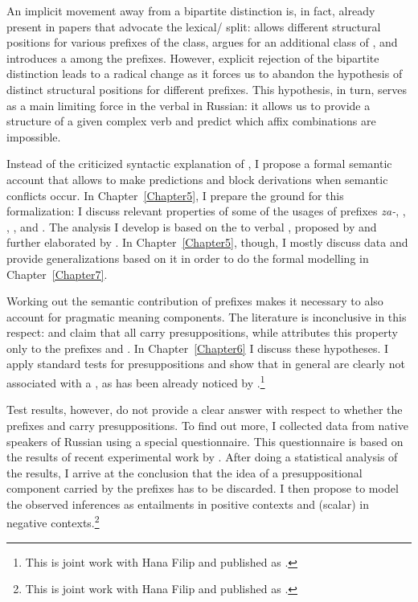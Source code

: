 An implicit movement away from a bipartite distinction is, in fact, already present in papers that advocate the lexical/ split: \citet{Svenonius:04b} allows different structural positions for various prefixes of the  class, \citet{Tatevosov:07} argues for an additional class of , and \citet{Tatevosov:09} introduces a  among the  prefixes. However, explicit rejection of the bipartite distinction leads to a radical change as it forces us to abandon the hypothesis of distinct structural positions for different prefixes. This hypothesis, in turn, serves as a main limiting force in the  verbal  in Russian: it allows us to provide a structure of a given complex verb and predict which affix combinations are impossible.

Instead of the criticized syntactic explanation of , I propose a formal semantic account that allows to make predictions and block derivations when semantic conflicts occur. In Chapter~\ref{Chapter5}, I prepare the ground for this formalization: I discuss relevant properties of some of the usages of prefixes \textit{\mbox{za-}}, , , , and . The analysis I develop is based on the  to verbal , proposed by \citet{Filip:08} and further elaborated by \citet{Kagan:12, Kagan:book}. In Chapter~\ref{Chapter5}, though, I mostly discuss data and provide generalizations based on it in order to do the formal modelling in Chapter~\ref{Chapter7}.

Working out the semantic contribution of prefixes makes it necessary to also account for pragmatic meaning components. The literature is inconclusive in this respect: \citet{Paducheva:96} and \citet{Romanova:06} claim that all  carry presuppositions, while \citet{Kagan:book} attributes this property only to the prefixes  and . In Chapter~\ref{Chapter6} I discuss these hypotheses. I apply standard tests for presuppositions and show that  in general are clearly not associated with a , as has been already noticed by \citet{Gronn:04}.\footnote{This is joint work with Hana Filip and published as \citealt{ZinovaFilip:14}.}

Test results, however, do not provide a clear answer with respect to whether the prefixes  and  carry presuppositions. To find out more, I collected data from native speakers of Russian using a special questionnaire. This questionnaire is based on the results of recent experimental work by \citet{Chemla:09}. After doing a statistical analysis of the results, I arrive at the conclusion that the idea of a presuppositional component carried by the prefixes has to be discarded. I then propose to model the observed inferences as entailments in positive contexts and (scalar)  in negative contexts.\footnote{This is joint work with Hana Filip and published as \citealt{ZinovaFilip:SALT}.}

